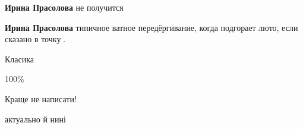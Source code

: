 \begin{itemize}
\begin{itemize}
 
\textbf{Ирина Прасолова} не получится

 
\textbf{Ирина Прасолова} типичное ватное передёргивание, когда подгорает люто, если сказано в точку🤣.

\end{itemize}

 
Класика

 
100\%

 
Краще не написати!

 
актуально й нині

 

\end{itemize}
